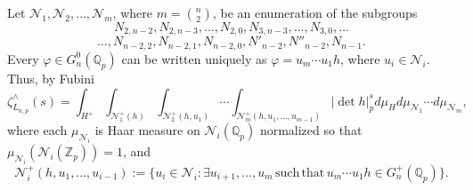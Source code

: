\documentclass{article}
\begin{document}
Let $\mathcal{N}_{1},\mathcal{N}_{2},\dots,\mathcal{N}_{m}$, where $m=\binom{n}{2}$, be an enumeration of the subgroups
\[N_{2,n-2},N_{2,n-3},\dots,N_{2,0},N_{3,n-3},\dots,N_{3,0},\dots\]\[\dots,N_{n-2,2},N_{n-2,1},N_{n-2,0},N'_{n-2},N''_{n-2},N_{n-1}.\]
Every $\varphi\in{G_{n}^{0}(\mathbb{Q}_{p})}$ can be written uniquely as $\varphi=u_{m}\cdots{u_{1}h}$, where $u_{i}\in{\mathcal{N}_{i}}$. Thus, by Fubini \[
\zeta_{L_{n,p}}^{\wedge}(s)=\displaystyle\int_{H^{+}}\displaystyle\int_{\mathcal{N}_{1}^{+}(h)}\displaystyle\int_{\mathcal{N}_{2}^{+}(h,u_{1})}\cdots\displaystyle\int_{\mathcal{N}_{m}^{+}(h,u_{1},\dots,u_{m-1})}|\det{h}|_{p}^{s}d\mu_{H}d\mu_{\mathcal{N}_{1}}\cdots{d\mu_{\mathcal{N}_{m}}},\]
where each $\mu_{\mathcal{N}_{i}}$ is Haar measure on $\mathcal{N}_{i}(\mathbb{Q}_{p})$ normalized so that\\ $\mu_{\mathcal{N}_{i}}(\mathcal{N}_{i}(\mathbb{Z}_{p}))=1$, and \[\mathcal{N}_{i}^{+}(h,u_{1},\dots,u_{i-1}):=\{u_{i}\in\mathcal{N}_{i} : \exists{u_{i+1},\dots,u_{m}}\,\mathrm{such}\,\mathrm{that}\,u_{m}\cdots{u_{1}}h\in{G_{n}^{+}(\mathbb{Q}_{p})}\}.\]
\end{document}

